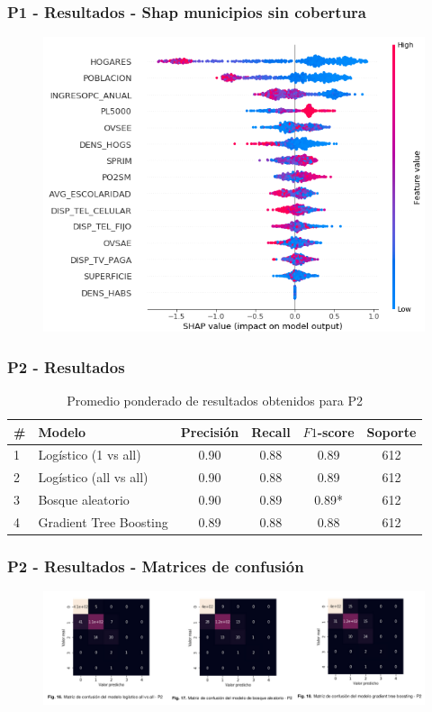 \documentclass[xcolor=dvipsnames, compress]{beamer}
\begin{document}
\begin{frame}
\frametitle{P1 - Resultados - Shap municipios sin cobertura}
\begin{figure}
	\includegraphics[scale=0.45]{images/p1_results_shap.png}
\end{figure}
\end{frame}



\begin{frame}
\frametitle{P2 - Resultados}

\begin{table}[tbhp]
	\centering
	\label{tab:p2_results}
	\begin{tabular}{@{}llcccc@{}}
		\hline
		\# & Modelo & Precisión& Recall & \multicolumn{1}{l}{$F1$-score} & Soporte \\ \hline
		1 & Logístico (1 vs all) & 0.90 & 0.88 & 0.89 & 612 \\
		2 & Logístico (all vs all) & 0.90 & 0.88 & 0.89 & 612 \\
		3 & Bosque aleatorio & 0.90 & 0.89 & 0.89* & 612 \\
		4 & Gradient Tree Boosting & 0.89 & 0.88 & 0.88 & 612\\ \hline
	\end{tabular}
	\caption{Promedio ponderado de resultados obtenidos para P2}
\end{table}

\end{frame}

\begin{frame}
\frametitle{P2 - Resultados - Matrices de confusión}
\begin{figure}
	\includegraphics[scale=0.5]{images/p2_results_matrix.png}
\end{figure}
\end{frame}
\end{document}
